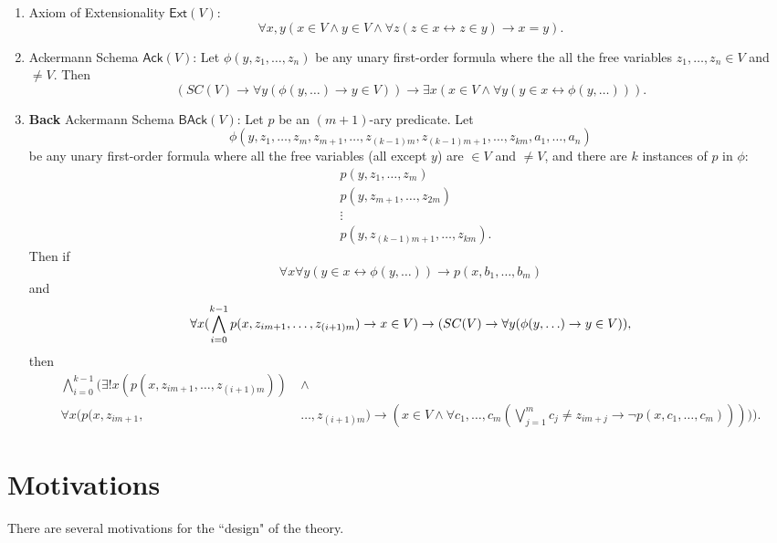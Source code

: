 \documentclass{article}
\begin{document}
\begin{enumerate}
	\item Axiom of Extensionality $\textsf{Ext}(V)$: $$\forall x, y (x \in V \wedge y \in V \wedge \forall z(z\in x \leftrightarrow z \in y) \rightarrow x = y).$$
	\item Ackermann Schema $\textsf{Ack}(V)$: Let $\phi(y, z_1, \ldots, z_n)$ be any unary first-order formula where the all the free variables $z_1, \ldots, z_n \in V$ and $\ne V$. Then $$(SC(V) \rightarrow \forall y(\phi(y, \ldots) \rightarrow y \in V)) \rightarrow \exists x(x \in V \wedge \forall y(y \in x \leftrightarrow \phi(y, \ldots))).$$
    \item \textbf{Back} Ackermann Schema $\textsf{BAck}(V)$: Let $p$ be an $(m+1)$-ary predicate. Let $$\phi(y, z_1, \ldots, z_m, z_{m+1}, \ldots, z_{(k-1)m}, z_{(k-1)m+1}, \ldots, z_{km}, a_1, \ldots, a_n)$$ be any unary first-order formula where all the free variables (all except $y$) are $\in V$ and $\ne V$, and there are $k$ instances of $p$ in $\phi$:
\begin{align*}
&p(y, z_1, \ldots, z_m) \\ &p(y, z_{m+1}, \ldots, z_{2m}) \\ &\vdots \\ &p(y, z_{(k-1)m+1}, \ldots, z_{km}).
\end{align*}
Then if
$$\forall x \forall y (y \in x \leftrightarrow \phi(y, \ldots)) \rightarrow p(x, b_1, \ldots, b_m)$$
and
$$\forall x(\bigwedge_{i=0}^{k-1}{p(x, z_{im+1}, \ldots, z_{(i+1)m})}\rightarrow x \in V) \rightarrow \\ (SC(V) \rightarrow \forall y(\phi(y, \ldots) \rightarrow y \in V)),$$
then
\begin{align*}
\bigwedge_{i=0}^{k-1}\Big(\exists!x(p(x, z_{im+1}, \ldots, z_{(i+1)m}))\ & \wedge \\ \forall x(p(x, z_{im+1}, &\ldots, z_{(i+1)m}) \rightarrow (x \in V \wedge \forall c_1, \ldots, c_m (\bigvee_{j=1}^m {c_j \ne z_{im+j}} \rightarrow \neg p(x, c_1, \ldots, c_m)) )) \Big).
\end{align*}
\end{enumerate}

\section{Motivations}
There are several motivations for the ``design" of the theory.\\
\end{document}
